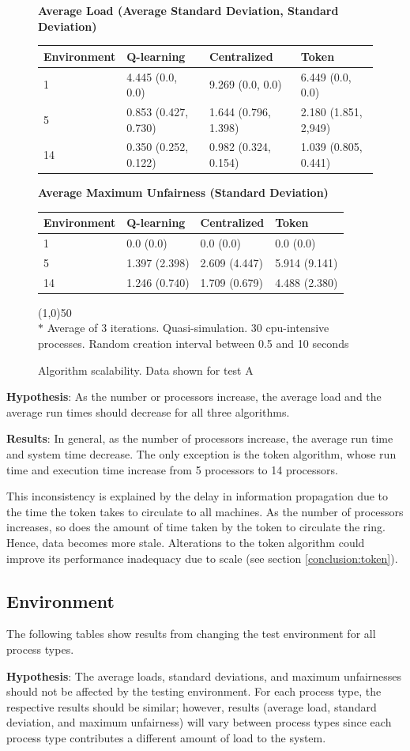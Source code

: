 \documentclass{report}
\newcommand{\envtbl}[6]{
\begin{figure}[H]

\begin{center}
\textbf{#1}
\end{center}

\begin{tabularx}{\linewidth}{|X|X|X|X|} \hline
	\textbf{Environment} & \textbf{Q-learning} & \textbf{Centralized} & \textbf{Token} \\ \hline
	#2
\end{tabularx}

\begin{center}
\textbf{#3}
\end{center}

\begin{tabularx}{\linewidth}{|X|X|X|X|} \hline
	\textbf{Environment} & \textbf{Q-learning} & \textbf{Centralized} & \textbf{Token} \\ \hline
	#4
\end{tabularx}

\vspace{1em}
\line(1,0){50} \\
#5

\caption{#6}
\end{figure}}
\begin{document}
\envtbl{Average Load (Average Standard Deviation, Standard Deviation)}
{	1  & 4.445 (0.0, 0.0) & 9.269 (0.0, 0.0) & 6.449 (0.0, 0.0)  \\ \hline
	5  & 0.853 (0.427, 0.730) & 1.644 (0.796, 1.398) & 2.180 (1.851,
2,949) \\ \hline
	14 & 0.350 (0.252, 0.122) & 0.982 (0.324, 0.154) & 1.039 (0.805, 0.441) \\ \hline}
{Average Maximum Unfairness (Standard Deviation)}
{	1  & 0.0 (0.0) & 0.0 (0.0) & 0.0 (0.0)  \\ \hline
	5  & 1.397 (2.398) & 2.609 (4.447) & 5.914 (9.141) \\ \hline
	14 & 1.246 (0.740) & 1.709 (0.679) & 4.488 (2.380) \\ \hline}
{$*$ Average of 3 iterations.  Quasi-simulation.  30 cpu-intensive
processes.  Random creation interval between 0.5 and 10 seconds}
{Algorithm scalability.  Data shown for test A}

\textbf{Hypothesis}:  As the number or processors increase, the average load
and the average run times should decrease for all three algorithms.

\textbf{Results}: In general, as the number of processors increase, the
average run time and system time decrease.  The only exception is the token
algorithm, whose run time and execution time increase from 5 processors to
14 processors.

This inconsistency is explained by the delay in information propagation due
to the time the token takes to circulate to all machines.  As the number of
processors increases, so does the amount of time taken by the token to
circulate the ring.  Hence, data becomes more stale.  Alterations to the
token algorithm could improve its performance inadequacy due to scale (see
section \ref{conclusion:token}).



\subsection{Environment}

\label{sec:environ}

The following tables show results from changing the test environment for all
process types.

\textbf{Hypothesis}: The average loads, standard deviations, and maximum
unfairnesses should not be affected by the testing environment.  For each
process type, the respective results should be similar; however, results
(average load, standard deviation, and maximum unfairness) will vary between
process types since each process type contributes a different amount of load
to the system.
\end{document}
